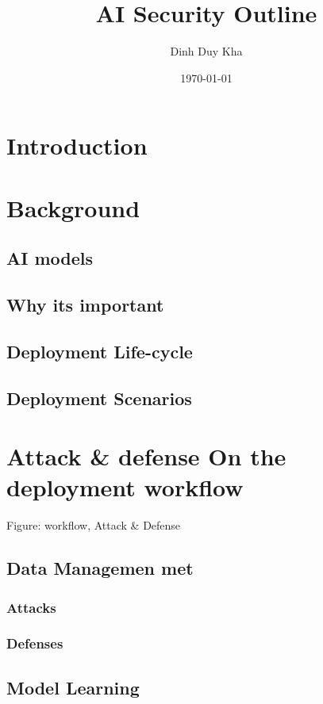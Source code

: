 \documentclass[11pt]{article}
\author{Dinh Duy Kha}
\date{\today}
\title{AI Security Outline}
\begin{document}
\maketitle
\tableofcontents

\cite{ashmore2019assuring}
\section{Introduction}
\label{sec:org6bea872}
\section{Background}
\label{sec:org2345125}
\subsection{AI models}
\label{sec:orgaa3d219}
\subsection{Why its important}
\label{sec:orgf074c59}
\subsection{Deployment Life-cycle}
\label{sec:orgd4f1008}
\subsection{Deployment Scenarios}
\label{sec:orga6eadda}
\section{Attack \& defense On the deployment workflow}
\label{sec:org5060bb8}
Figure: workflow, Attack \& Defense
\subsection{Data Managemen met}
\label{sec:org91de5e5}
\subsubsection{Attacks}
\label{sec:org35d78d6}
\subsubsection{Defenses}
\label{sec:org7b753b0}
\subsection{Model Learning}
\label{sec:orgfba6217}
\end{document}
